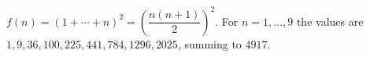 $f (n) = (1+\cdots+n)^2 = (\dfrac{n (n+1)}{2})^2$. For $n=1,\ldots,9$ the values are $1,9,36,100,225,441,784,1296,2025$, summing to $\boxed{4917}$.
